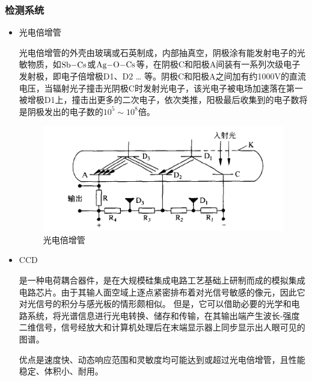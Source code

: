 \subsubsection{检测系统}
\begin{itemize}
	\item 光电倍增管
	
		光电倍增管的外壳由玻璃或石英制成，内部抽真空，阴极涂有能发射电子的光敏物质，如$\ce{Sb-Cs}$或$\ce{Ag-O-Cs}$等，在阴极C和阳极A间装有一系列次级电子发射极，即电子倍增极D1、D2 … 等。阴极C和阳极A之间加有约1000V的直流电压，当辐射光子撞击光阴极C时发射光电子，该光电子被电场加速落在第一被增极D1上，撞击出更多的二次电子，依次类推，阳极最后收集到的电子数将是阴极发出的电子数的$10^5\sim 10^8$倍。
		\begin{figure}[!h]
			\centering
			\includegraphics[width=0.7\linewidth]{image/chp8_guangdianbeizengguan}
			\caption{光电倍增管}
			\label{fig:chp8guangdianbeizengguan}
		\end{figure}
	\item CCD
	
		是一种电荷耦合器件，是在大规模硅集成电路工艺基础上研制而成的模拟集成电路芯片。由于其输人面空域上逐点紧密排布着对光信号敏感的像元，因此它对光信号的积分与感光板的情形颇相似。
		但是，它可以借助必要的光学和电路系统，将光谱信息进行光电转换、储存和传输，在其输出端产生波长-强度二维信号，信号经放大和计算机处理后在末端显示器上同步显示出人眼可见的图谱。
		
		优点是速度快、动态响应范围和灵敏度均可能达到或超过光电倍增管，且性能稳定、体积小、耐用。
\end{itemize}

